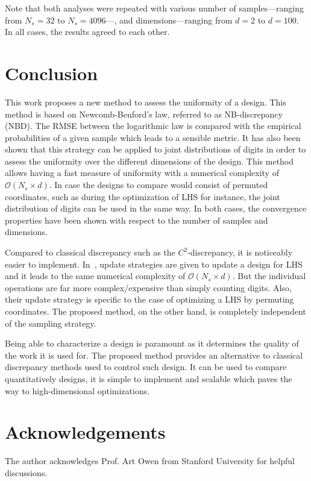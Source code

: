\documentclass[1p]{elsarticle}
\begin{document}
Note that both analyses were repeated with various number of samples---ranging from $N_s=32$ to $N_s=4096$---, and dimensions---ranging from $d=2$ to $d=100$. In all cases, the results agreed to each other.


\cleardoublepage
\section{Conclusion}\label{sec:conclusion}


This work proposes a new method to assess the uniformity of a design. This method is based on Newcomb-Benford's law, referred to as NB-discrepancy (NBD). The RMSE between the logarithmic law is compared with the empirical probabilities of a given sample which leads to a sensible metric. It has also been shown that this strategy can be applied to joint distributions of digits in order to assess the uniformity over the different dimensions of the design. This method allows having a fast measure of uniformity with a numerical complexity of $\mathcal{O}(N_s \times d)$. In case the designs to compare would consist of permuted coordinates, such as during the optimization of LHS for instance, the joint distribution of digits can be used in the same way. In both cases, the convergence properties have been shown with respect to the number of samples and dimensions.

Compared to classical discrepancy such as the $C^2$-discrepancy, it is noticeably easier to implement. In~\citep{Fang2006}, update strategies are given to update a design for LHS and it leads to the same numerical complexity of $\mathcal{O}(N_s \times d)$. But the individual operations are far more complex/expensive than simply counting digits. Also, their update strategy is specific to the case of optimizing a LHS by permuting coordinates. The proposed method, on the other hand, is completely independent of the sampling strategy.

Being able to characterize a design is paramount as it determines the quality of the work it is used for. The proposed method provides an alternative to classical discrepancy methods used to control such design. It can be used to compare quantitatively designs, it is simple to implement and scalable which paves the way to high-dimensional optimizations.


\section*{Acknowledgements}
The author acknowledges Prof. Art Owen from Stanford University for helpful discussions.


\end{document}
